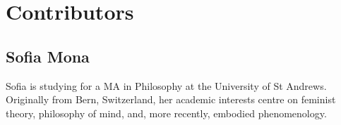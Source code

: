 \chapter{Contributors}

\section*{Sofia Mona}

Sofia is studying for a MA in Philosophy at the University of St
Andrews. Originally from Bern, Switzerland, her academic interests
centre on feminist theory, philosophy of mind, and, more recently,
embodied phenomenology.

